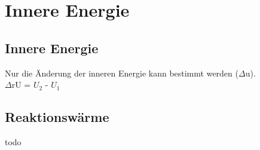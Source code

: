 \section{Innere Energie} \label{sec:innere_energie}

\subsection{Innere Energie}
Nur die Änderung der inneren Energie kann bestimmt werden ($\Delta$u). \\
$\Delta$rU = $U_2$ - $U_1$


\subsection{Reaktionswärme}
todo
